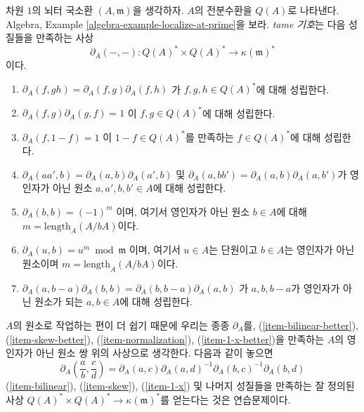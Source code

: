 \noindent
차원 $1$의 뇌터 국소환 $(A, \mathfrak m)$을 생각하자. $A$의 전분수환을
$Q(A)$로 나타낸다. Algebra, Example
\ref{algebra-example-localize-at-prime}을 보라. {\it tame 기호}는
다음 성질들을 만족하는 사상
$$
\partial_A(-, -) : Q(A)^* \times Q(A)^* \longrightarrow \kappa(\mathfrak m)^*
$$
이다.
\begin{enumerate}
\item $\partial_A(f, gh) = \partial_A(f, g) \partial_A(f, h)$
\label{item-bilinear}
가 $f, g, h \in Q(A)^*$에 대해 성립한다.
\item $\partial_A(f, g) \partial_A(g, f) = 1$
\label{item-skew}
이 $f, g \in Q(A)^*$에 대해 성립한다.
\item $\partial_A(f, 1 - f) = 1$
\label{item-1-x}
이 $1 - f \in Q(A)^*$를 만족하는 $f \in Q(A)^*$에 대해 성립한다.
\item $\partial_A(aa', b) = \partial_A(a, b)\partial_A(a', b)$
\label{item-bilinear-better}
및 $\partial_A(a, bb') = \partial_A(a, b)\partial_A(a, b')$가 영인자가
아닌 원소 $a, a', b, b' \in A$에 대해 성립한다.
\item $\partial_A(b, b) = (-1)^m$
\label{item-skew-better}
이며, 여기서 영인자가 아닌 원소 $b \in A$에 대해
$m = \text{length}_A(A/bA)$이다.
\item $\partial_A(u, b) = u^m \bmod \mathfrak m$
\label{item-normalization}
이며, 여기서 $u \in A$는 단원이고 $b \in A$는 영인자가 아닌 원소이며
$m = \text{length}_A(A/bA)$이다.
\item
\label{item-1-x-better}
$\partial_A(a, b - a)\partial_A(b, b) = \partial_A(b, b - a)\partial_A(a, b)$
가 $a, b, b - a$가 영인자가 아닌 원소가 되는 $a, b \in A$에 대해
성립한다.
\end{enumerate}
$A$의 원소로 작업하는 편이 더 쉽기 때문에 우리는 종종
$\partial_A$를, (\ref{item-bilinear-better}),
(\ref{item-skew-better}), (\ref{item-normalization}),
(\ref{item-1-x-better})을 만족하는 $A$의 영인자가 아닌 원소 쌍 위의
사상으로 생각한다. 다음과 같이 놓으면
$$
\partial_A(\frac{a}{b}, \frac{c}{d}) =
\partial_A(a, c) \partial_A(a, d)^{-1} \partial_A(b, c)^{-1} \partial_A(b, d)
$$
(\ref{item-bilinear}), (\ref{item-skew}), (\ref{item-1-x}) 및 나머지
성질들을 만족하는 잘 정의된 사상
$Q(A)^* \times Q(A)^* \to \kappa(\mathfrak m)^*$를 얻는다는 것은
연습문제이다.

